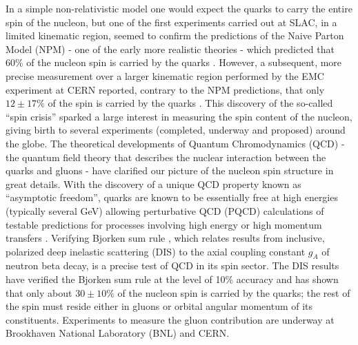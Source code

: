 In a simple non-relativistic model one would expect the quarks to carry the entire spin of the nucleon, but one of the first experiments carried out at SLAC, in a limited kinematic region, seemed to confirm the predictions of the Naive  Parton Model (NPM) - one of the early more realistic theories - which predicted that 60\% of the nucleon spin is carried by the quarks \cite{Dharmawardane200611}.%
However, a subsequent, more precise measurement over a %
larger kinematic region performed by the EMC experiment at CERN reported, contrary to the NPM predictions, that only $12\pm 17\%$ %
of the spin is carried by the quarks \cite{Ashman1988364}. %
This discovery of the so-called ``spin crisis'' %
 sparked a large interest in measuring the spin content of the nucleon, giving birth to several experiments (completed, underway and proposed) around the globe. The %
 theoretical developments of Quantum Chromodynamics (QCD) - the quantum field theory that describes the nuclear interaction between the quarks and gluons - have clarified our picture of the nucleon spin structure in great details. With the discovery of a unique QCD property known as ``asymptotic freedom'', quarks are %
 known to be essentially free %
at high energies (typically several GeV)
allowing perturbative QCD (PQCD) calculations of testable predictions for processes involving high energy or high momentum transfers \cite{wikiCoupling}.  
Verifying Bjorken sum rule \cite{PhysRevD.10.2445}, which relates results from 
 inclusive, polarized deep inelastic scattering (DIS) %
to the %
axial coupling constant $g_A$ of neutron beta decay, is a precise %
 test of QCD in its spin sector. %
The DIS results have verified the Bjorken sum rule at the level of 10\% accuracy and has shown that only about $30 \pm 10\%$ of the nucleon spin is carried by the quarks; the rest of the spin must reside either in gluons or orbital angular momentum of its constituents. Experiments to measure the gluon contribution are underway at %
Brookhaven National Laboratory (BNL) and CERN. %

